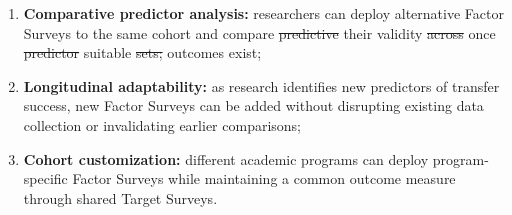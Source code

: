\documentclass[letterpaper,11pt]{article}
\newcommand{\DIFdel}[1]{%
  \begingroup\setlength{\fboxsep}{0.5pt}%
  \colorbox{diffdelbg}{\textcolor{diffdeltext}{\sout{#1}}}%
  \endgroup}
\newcommand{\DIFadd}[1]{%
  \begingroup\setlength{\fboxsep}{0.5pt}%
  \colorbox{diffaddbg}{\textcolor{diffaddtext}{#1}}%
  \endgroup}
\begin{document}
\begin{enumerate}
    \item \textbf{Comparative predictor analysis:} researchers can deploy alternative Factor Surveys to the same cohort and compare \DIFdel{predictive} \DIFadd{their} validity \DIFdel{across} \DIFadd{once} \DIFdel{predictor} \DIFadd{suitable} \DIFdel{sets;} \DIFadd{outcomes} \DIFadd{exist;}
    \item \textbf{Longitudinal adaptability:} as research identifies new predictors of transfer success, new Factor Surveys can be added without disrupting existing data collection or invalidating earlier comparisons;
    \item \textbf{Cohort customization:} different academic programs can deploy program-specific Factor Surveys while maintaining a common outcome measure through shared Target Surveys.
\end{enumerate}
\end{document}
